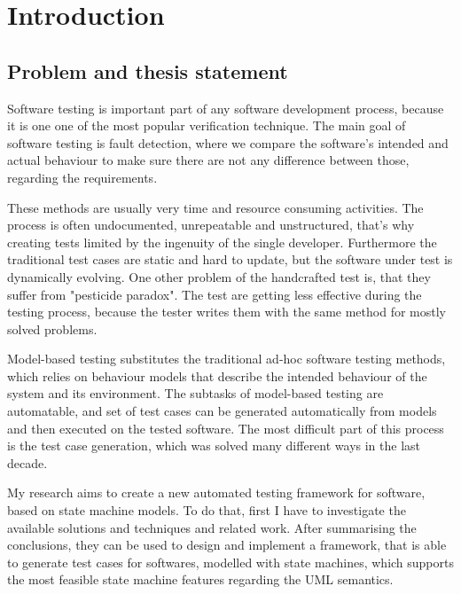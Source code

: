 \chapter*{Introduction}
\label{cha:introduction}

\section*{Problem and thesis statement}
\label{sec:problem}

Software testing is important part of any software development process, because it is one one of the most popular verification technique. The main goal of software testing is fault detection, where we compare the software's intended and actual behaviour to make sure there are not any difference between those, regarding the requirements.

These methods are usually very time and resource consuming activities. The process is often undocumented, unrepeatable and unstructured, that's why creating tests limited by the ingenuity of the single developer. Furthermore the traditional test cases are static and hard to update, but the software under test is dynamically evolving. One other problem of the handcrafted test is, that they suffer from "pesticide paradox". The test are getting less effective during the testing process, because the tester writes them with the same method for mostly solved problems.

Model-based testing substitutes the traditional ad-hoc software testing methods, which relies on behaviour models that describe the intended behaviour of the system and its environment. The subtasks of model-based testing are automatable, and set of test cases can be generated automatically from models and then executed on the tested software. The most difficult part of this process is the test case generation, which was solved many different ways in the last decade.

My research aims to create a new automated testing framework for software, based on state machine models. To do that, first I have to investigate the available solutions and techniques and related work. After summarising the conclusions, they can be used to design and implement a framework, that is able to generate test cases for softwares, modelled with state machines, which supports the most feasible state machine features regarding the UML semantics.

